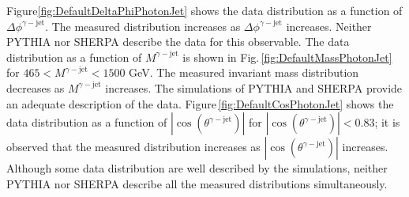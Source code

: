 \documentclass[12pt, twoside]{article}
\numberwithin{equation}{section}
\numberwithin{figure}{section}
\begin{document}
Figure\;\ref{fig:DefaultDeltaPhiPhotonJet} shows the data distribution as a function of $\Delta \phi^{\gamma-\text{jet}}$. The measured distribution increases as $\Delta \phi^{\gamma-\text{jet}}$ increases. Neither PYTHIA nor SHERPA describe the data for this observable. The data distribution as a function of $M^{\gamma-\text{jet}}$ is shown in Fig.\,\ref{fig:DefaultMassPhotonJet} for $465 < M^{\gamma-\text{jet}} < 1500$ GeV. The measured invariant mass distribution decreases as $M^{\gamma-\text{jet}}$ increases. The simulations of PYTHIA and SHERPA provide an adequate description of the data. Figure\,\ref{fig:DefaultCosPhotonJet} shows the data distribution as a function of $\left| \cos \left( \theta^{\gamma-\text{jet}} \right) \right|$ for $\left| \cos \left( \theta^{\gamma-\text{jet}} \right) \right| < 0.83$; it is observed that the measured distribution increases as $\left| \cos \left( \theta^{\gamma-\text{jet}} \right) \right|$ increases. Although some data distribution are well described by the simulations, neither PYTHIA nor SHERPA describe all the measured distributions simultaneously.
\end{document}
